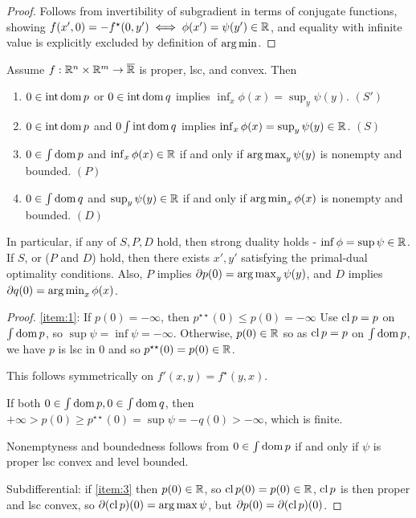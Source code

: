 \begin{proof}
  Follows from invertibility of subgradient in terms of conjugate
  functions, showing $f(x', 0) = -f^{\star}(0, y') \iff \phi(x') =
  \psi(y') \in \mathbb{R}$, and equality with infinite value is explicitly
  excluded by definition of $\operatorname*{arg\,min}$.
\end{proof}

\begin{thm}
  \label{sec:duality-optimization-6}
  Assume $f: \mathbb{R}^{n} \times \mathbb{R}^{m} \rightarrow \overline {\mathbb{R}}$ is proper,
  lsc, and convex. Then
  \begin{enumerate}
  \item\label{item:1} $0 \in \operatorname*{int} \operatorname*{dom} p$ or $0 \in \operatorname*{int} \operatorname*{dom} q$ implies
    $\inf_{x} \phi(x) = \sup_{y} \psi(y)$. $(S')$
  \item\label{item:2} $0 \in \operatorname*{int} \operatorname*{dom} p$ and $0 \int \operatorname*{int} \operatorname*{dom} q$ implies
    $\inf_{x} \phi(x) = \sup_{y} \psi(y) \in \mathbb{R}$. $(S)$
  \item\label{item:3} $0 \in \int \operatorname*{dom} p$ and $\inf_{x} \phi(x) \in \mathbb{R}$ if and only
    if $\operatorname*{arg\,max}_{y} \psi(y)$ is nonempty and bounded. $(P)$
  \item\label{item:4} $0 \in \int \operatorname*{dom} q$ and $\sup_{y} \psi(y) \in \mathbb{R}$ if and only
    if $\operatorname*{arg\,min}_{x} \phi(x)$ is nonempty and bounded. $(D)$
  \end{enumerate}
  In particular, if any of $S, P, D$ hold, then strong duality holds -
  $\inf \phi = \sup \psi \in \mathbb{R}$. If $S$, or ($P$ and $D$) hold, then
  there exists $x', y'$ satisfying the primal-dual optimality
  conditions. Also, $P$ implies $\partial p(0) = \operatorname*{arg\,max}_{y}
  \psi(y)$, and $D$ implies $\partial q(0) = \operatorname*{arg\,min}_{x}
  \phi(x)$.
\end{thm}

\begin{proof}
  \ref{item:1}: If $p(0) = -\infty$, then $p^{\star \star}(0) \leq
  p(0) = -\infty$ Use $\operatorname*{cl} p = p$ on $\int \operatorname*{dom} p$, so $\sup \psi =
  \inf \psi = -\infty$.  Otherwise, $p(0) \in \mathbb{R}$ so as $\operatorname*{cl} p = p$ on
  $\int \operatorname*{dom} p$, we have $p$ is lsc in 0 and so $p^{\star \star}(0) =
  p(0) \in \mathbb{R}$.

  This follows symmetrically on $f'(x, y) = f^{\star}(y, x)$.

  If both $0 \in \int \operatorname*{dom} p,  0 \in \int \operatorname*{dom} q$, then $+\infty >
  p(0) \geq p^{\star \star}(0) = \sup \psi = -q(0) > -\infty$, which
  is finite.

  Nonemptyness and boundedness follows from $0 \in \int \operatorname*{dom} p$ if and
  only if $\psi $ is proper lsc convex and level bounded.

  Subdifferential: if \ref{item:3} then $p(0) \in \mathbb{R}$, so $\operatorname*{cl} p(0) =
  p(0) \in \mathbb{R}$, $\operatorname*{cl} p$ is then proper and lsc convex, so $\partial
  (\operatorname*{cl} p)(0) = \arg \max \psi$, but $\partial p(0) = \partial (\operatorname*{cl}
  p)(0)$.
\end{proof}

